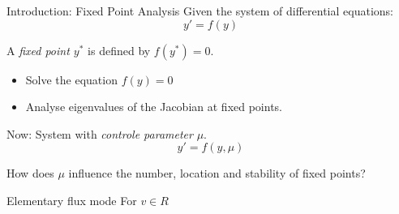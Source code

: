 \documentclass{beamer}
\begin{document}
\begin{frame}{Introduction: Fixed Point Analysis}
    Given the system of differential equations:
    $$y' = f(y) $$
    \begin{definition}
        A \emph{fixed point $y^*$} is defined by $f(y^*)=0$.
    \end{definition}
    \begin{itemize}
        \item Solve the equation $f(y) = 0$ 
        \item Analyse eigenvalues of the Jacobian at fixed points.
    \end{itemize}
    Now: System with \emph{controle parameter} $\mu$. 
    $$y' = f(y, \mu)$${}    
    \begin{block}{}
        How does $\mu$ influence the number, location and stability of fixed points?
    \end{block}
\end{frame}

\begin{frame}{Elementary flux mode}
    For $v \in R$
\end{frame}
\end{document}
